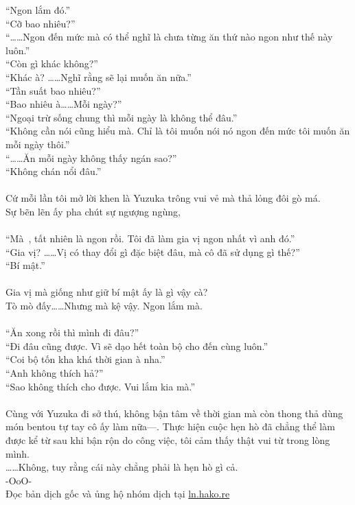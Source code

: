 \documentclass[12pt,a4paper, twosides]{book}
\begin{document}
“Ngon lắm đó.”\\
“Cỡ bao nhiêu?”\\
“……Ngon đến mức mà có thể nghĩ là chưa từng ăn thứ nào ngon như thế này luôn.”\\
“Còn gì khác không?”\\
“Khác à? ……Nghĩ rằng sẽ lại muốn ăn nữa.”\\
“Tần suất bao nhiêu?”\\
“Bao nhiêu à……Mỗi ngày?”\\
“Ngoại trừ sống chung thì mỗi ngày là không thể đâu.”\\
“Không cần nói cũng hiểu mà. Chỉ là tôi muốn nói nó ngon đến mức tôi muốn ăn mỗi ngày thôi.”\\
“……Ăn mỗi ngày không thấy ngán sao?”\\
“Không chán nổi đâu.”\\
\\
Cứ mỗi lần tôi mở lời khen là Yuzuka trông vui vẻ mà thả lỏng đôi gò má.\\
Sự bẽn lẽn ấy pha chút sự ngượng ngùng,\\
\\
“Mà~, tất nhiên là ngon rồi. Tôi đã làm gia vị ngon nhất vì anh đó.”\\
“Gia vị? ……Vị có thay đổi gì đặc biệt đâu, mà cô đã sử dụng gì thế?”\\
“Bí mật.”\\
\\
Gia vị mà giống như giữ bí mật ấy là gì vậy cà?\\
Tò mò đấy……Nhưng mà kệ vậy. Ngon lắm mà.\\
\\
“Ăn xong rồi thì mình đi đâu?”\\
“Đi đâu cũng được. Vì sẽ dạo hết toàn bộ cho đến cùng luôn.”\\
“Coi bộ tốn kha khá thời gian à nha.”\\
“Anh không thích hả?”\\
“Sao không thích cho được. Vui lắm kia mà.”\\
\\
Cùng với Yuzuka đi sở thú, không bận tâm về thời gian mà còn thong thả dùng món bentou tự tay cô ấy làm nữa—. Thực hiện cuộc hẹn hò đã chẳng thể làm được kể từ sau khi bận rộn do công việc, tôi cảm thấy thật vui từ trong lòng mình.\\
……Không, tuy rằng cái này chẳng phải là hẹn hò gì cả.\\
-OoO-\\
Đọc bản dịch gốc và ủng hộ nhóm dịch tại \href{https://ln.hako.re/}{ln.hako.re}\\
\newpage
\end{document}
